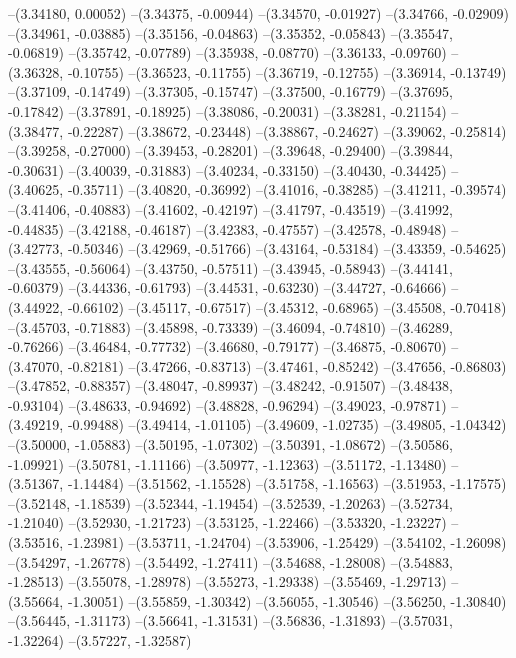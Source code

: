 --(3.34180, 0.00052)
--(3.34375, -0.00944)
--(3.34570, -0.01927)
--(3.34766, -0.02909)
--(3.34961, -0.03885)
--(3.35156, -0.04863)
--(3.35352, -0.05843)
--(3.35547, -0.06819)
--(3.35742, -0.07789)
--(3.35938, -0.08770)
--(3.36133, -0.09760)
--(3.36328, -0.10755)
--(3.36523, -0.11755)
--(3.36719, -0.12755)
--(3.36914, -0.13749)
--(3.37109, -0.14749)
--(3.37305, -0.15747)
--(3.37500, -0.16779)
--(3.37695, -0.17842)
--(3.37891, -0.18925)
--(3.38086, -0.20031)
--(3.38281, -0.21154)
--(3.38477, -0.22287)
--(3.38672, -0.23448)
--(3.38867, -0.24627)
--(3.39062, -0.25814)
--(3.39258, -0.27000)
--(3.39453, -0.28201)
--(3.39648, -0.29400)
--(3.39844, -0.30631)
--(3.40039, -0.31883)
--(3.40234, -0.33150)
--(3.40430, -0.34425)
--(3.40625, -0.35711)
--(3.40820, -0.36992)
--(3.41016, -0.38285)
--(3.41211, -0.39574)
--(3.41406, -0.40883)
--(3.41602, -0.42197)
--(3.41797, -0.43519)
--(3.41992, -0.44835)
--(3.42188, -0.46187)
--(3.42383, -0.47557)
--(3.42578, -0.48948)
--(3.42773, -0.50346)
--(3.42969, -0.51766)
--(3.43164, -0.53184)
--(3.43359, -0.54625)
--(3.43555, -0.56064)
--(3.43750, -0.57511)
--(3.43945, -0.58943)
--(3.44141, -0.60379)
--(3.44336, -0.61793)
--(3.44531, -0.63230)
--(3.44727, -0.64666)
--(3.44922, -0.66102)
--(3.45117, -0.67517)
--(3.45312, -0.68965)
--(3.45508, -0.70418)
--(3.45703, -0.71883)
--(3.45898, -0.73339)
--(3.46094, -0.74810)
--(3.46289, -0.76266)
--(3.46484, -0.77732)
--(3.46680, -0.79177)
--(3.46875, -0.80670)
--(3.47070, -0.82181)
--(3.47266, -0.83713)
--(3.47461, -0.85242)
--(3.47656, -0.86803)
--(3.47852, -0.88357)
--(3.48047, -0.89937)
--(3.48242, -0.91507)
--(3.48438, -0.93104)
--(3.48633, -0.94692)
--(3.48828, -0.96294)
--(3.49023, -0.97871)
--(3.49219, -0.99488)
--(3.49414, -1.01105)
--(3.49609, -1.02735)
--(3.49805, -1.04342)
--(3.50000, -1.05883)
--(3.50195, -1.07302)
--(3.50391, -1.08672)
--(3.50586, -1.09921)
--(3.50781, -1.11166)
--(3.50977, -1.12363)
--(3.51172, -1.13480)
--(3.51367, -1.14484)
--(3.51562, -1.15528)
--(3.51758, -1.16563)
--(3.51953, -1.17575)
--(3.52148, -1.18539)
--(3.52344, -1.19454)
--(3.52539, -1.20263)
--(3.52734, -1.21040)
--(3.52930, -1.21723)
--(3.53125, -1.22466)
--(3.53320, -1.23227)
--(3.53516, -1.23981)
--(3.53711, -1.24704)
--(3.53906, -1.25429)
--(3.54102, -1.26098)
--(3.54297, -1.26778)
--(3.54492, -1.27411)
--(3.54688, -1.28008)
--(3.54883, -1.28513)
--(3.55078, -1.28978)
--(3.55273, -1.29338)
--(3.55469, -1.29713)
--(3.55664, -1.30051)
--(3.55859, -1.30342)
--(3.56055, -1.30546)
--(3.56250, -1.30840)
--(3.56445, -1.31173)
--(3.56641, -1.31531)
--(3.56836, -1.31893)
--(3.57031, -1.32264)
--(3.57227, -1.32587)
